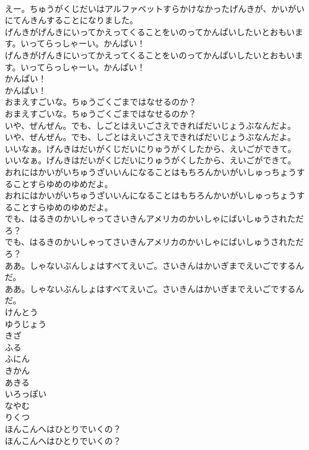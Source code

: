 \documentclass[8pt]{extreport}
\begin{document}
\begin{CJK}{UTF8}{min}
\\	えー。ちゅうがくじだいはアルファベットすらかけなかったげんきが、かいがいにてんきんすることになりました。
\\	げんきがげんきにいってかえってくることをいのってかんぱいしたいとおもいます。いってらっしゃーい。かんぱい！
\\	げんきがげんきにいってかえってくることをいのってかんぱいしたいとおもいます。いってらっしゃーい。かんぱい！
\\	かんぱい！
\\	かんぱい！
\\	おまえすごいな。ちゅうごくごまではなせるのか？
\\	おまえすごいな。ちゅうごくごまではなせるのか？
\\	いや、ぜんぜん。でも、しごとはえいごさえできればだいじょうぶなんだよ。
\\	いや、ぜんぜん。でも、しごとはえいごさえできればだいじょうぶなんだよ。
\\	いいなぁ。げんきはだいがくじだいにりゅうがくしたから、えいごができて。
\\	いいなぁ。げんきはだいがくじだいにりゅうがくしたから、えいごができて。
\\	おれにはかいがいちゅうざいいんになることはもちろんかいがいしゅっちょうすることすらゆめのゆめだよ。
\\	おれにはかいがいちゅうざいいんになることはもちろんかいがいしゅっちょうすることすらゆめのゆめだよ。
\\	でも、はるきのかいしゃってさいきんアメリカのかいしゃにばいしゅうされただろ？
\\	でも、はるきのかいしゃってさいきんアメリカのかいしゃにばいしゅうされただろ？
\\	ああ。しゃないぶんしょはすべてえいご。さいきんはかいぎまでえいごでするんだ。
\\	ああ。しゃないぶんしょはすべてえいご。さいきんはかいぎまでえいごでするんだ。
\\	けんとう
\\	ゆうじょう
\\	きざ
\\	ふる
\\	ふにん
\\	きかん
\\	あきる
\\	いろっぽい
\\	なやむ
\\	りくつ
\\	ほんこんへはひとりでいくの？
\\	ほんこんへはひとりでいくの？

\end{CJK}
\end{document}
